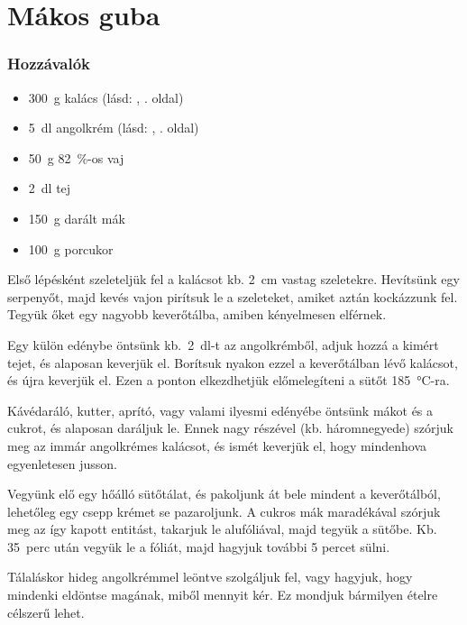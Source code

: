 \newpage
\section{Mákos guba} \label{sec:makos_guba}

\subsubsection*{Hozzávalók}
\begin{itemize}
    \item \qty{300}{\g} kalács (lásd: , \pageref{sec:kalacs}. oldal)
    \item \qty{5}{\deci\l} angolkrém (lásd: , \pageref{sec:angolkem}. oldal)
    \item \qty{50}{\g} \qty{82}{\percent}-os vaj
    \item \qty{2}{\deci\l} tej
    \item \qty{150}{\g} darált mák
    \item \qty{100}{\g} porcukor
\end{itemize}

Első lépésként szeleteljük fel a kalácsot kb. \qty{2}{\cm} vastag szeletekre. Hevítsünk egy serpenyőt, majd kevés vajon pirítsuk le a szeleteket, amiket aztán kockázzunk fel. Tegyük őket egy nagyobb keverőtálba, amiben kényelmesen elférnek.

Egy külön edénybe öntsünk kb.~\qty{2}{\deci\l}-t az angolkrémből, adjuk hozzá a kimért tejet, és alaposan keverjük el. Borítsuk nyakon ezzel a keverőtálban lévő kalácsot, és újra keverjük el. Ezen a ponton elkezdhetjük előmelegíteni a sütőt \qty{185}{\celsius}-ra.

Kávédaráló, kutter, aprító, vagy valami ilyesmi edényébe öntsünk mákot és a cukrot, és alaposan daráljuk le. Ennek nagy részével (kb. háromnegyede) szórjuk meg az immár angolkrémes kalácsot, és ismét keverjük el, hogy mindenhova egyenletesen jusson.

Vegyünk elő egy hőálló sütőtálat, és pakoljunk át bele mindent a keverőtálból, lehetőleg egy csepp krémet se pazaroljunk. A cukros mák maradékával szórjuk meg az így kapott entitást, takarjuk le alufóliával, majd tegyük a sütőbe. Kb. \num{35}~perc után vegyük le a fóliát, majd hagyjuk további \num{5} percet sülni.

Tálaláskor hideg angolkrémmel leöntve szolgáljuk fel, vagy hagyjuk, hogy mindenki eldöntse magának, miből mennyit kér. Ez mondjuk bármilyen ételre célszerű lehet.
